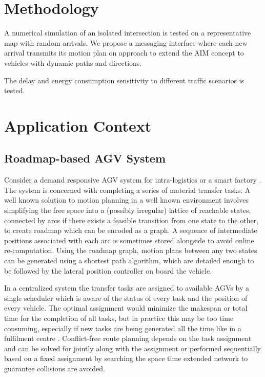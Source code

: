 \section{Methodology} 
A numerical simulation of an isolated intersection is tested on a representative map with random arrivals. We propose a messaging interface where each new arrival transmits its motion plan on approach to extend the AIM concept to vehicles with dynamic paths and directions.

The delay and energy consumption sensitivity to different traffic scenarios is tested.  

\section{Application Context}
\subsection{Roadmap-based AGV System}
Consider a demand responsive AGV system for intra-logistics \cite{Boysen2019} or a smart factory \cite{Dotoli2019}. The system is concerned with completing a series of material transfer tasks. 
A well known solution to motion planning in a well known environment involves simplifying the free space into a (possibly irregular) lattice of reachable states, connected by arcs if there exists a feasible transition from one state to the other, to create  roadmap which can be encoded as a graph. A sequence of intermediate positions associated with each arc is sometimes stored alongside to avoid online re-computation. Using the roadmap graph, motion plans between any two states can be generated using a shortest path algorithm, which are detailed enough to be followed by the lateral position controller on board the vehicle. 

In a centralized system the transfer tasks are assigned to available AGVs by a single scheduler which is aware of the status of every task and the position of every vehicle. The optimal assignment would minimize the makespan or total time for the completion of all tasks, but in practice this may be too time consuming, especially if new tasks are being generated all the time like in a fulfilment centre \cite{Azadeh2019}. Conflict-free route planning depends on the task assignment and can be solved for jointly along with the assignment or performed sequentially based on a fixed assignment by searching the space time extended network to guarantee collisions are avoided.

